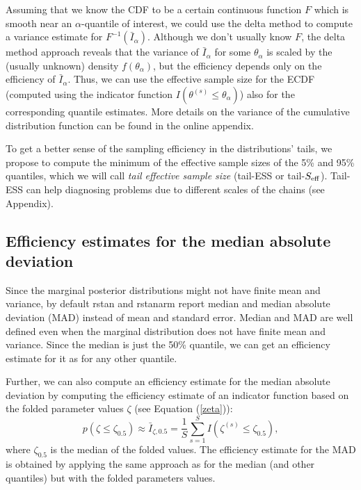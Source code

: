\documentclass[american,]{article}
\begin{document}
Assuming that we know the CDF to be a certain continuous function \(F\)
which is smooth near an \(\alpha\)-quantile of interest, we could use
the delta method to compute a variance estimate for
\(F^{-1}(\bar{I}_\alpha)\). Although we don't usually know \(F\), the
delta method approach reveals that the variance of \(\bar{I}_\alpha\)
for some \(\theta_\alpha\) is scaled by the (usually unknown) density
\(f(\theta_\alpha)\), but the efficiency depends only on the efficiency
of \(\bar{I}_\alpha\). Thus, we can use the effective sample size for
the ECDF (computed using the indicator function
\(I(\theta^{(s)} \leq \theta_\alpha)\)) also for the corresponding
quantile estimates. More details on the variance of the cumulative
distribution function can be found in the online appendix.

To get a better sense of the sampling efficiency in the
distributions' tails, we propose to compute the minimum of the effective
sample sizes of the 5\% and 95\% quantiles, which we will call
\emph{tail effective sample size} (tail-ESS or tail-\(S_{\rm eff}\)).
Tail-ESS can help diagnosing problems due to different scales of the
chains (see Appendix).


\hypertarget{efficiency-estimates-for-the-median-absolute-deviation}{%
\subsection{Efficiency estimates for the median absolute
deviation}\label{efficiency-estimates-for-the-median-absolute-deviation}}

Since the marginal posterior distributions might not have finite mean
and variance, by default rstan \citep{RStan.2.17} and rstanarm
\citep{RStanARM.2.17} report median and median absolute deviation (MAD)
instead of mean and standard error. Median and MAD are well defined
even when the marginal distribution does not have finite mean and
variance. Since the median is just the 50\% quantile, we can get an
efficiency estimate for it as for any other quantile.

Further, we can also compute an efficiency estimate for the median
absolute deviation by computing the efficiency estimate of an
indicator function based on the folded parameter values \(\zeta\) (see
Equation (\ref{zeta})):
\begin{equation}
p(\zeta \leq \zeta_{0.5}) \approx \bar{I}_{\zeta,0.5} = \frac{1}{S}\sum_{s=1}^S
I(\zeta^{(s)} \leq \zeta_{0.5}),
\end{equation}
where \(\zeta_{0.5}\) is the median of the folded values. The efficiency estimate for the MAD is obtained by applying the same
approach as for the median (and other quantiles) but with the folded
parameters values.
\end{document}
